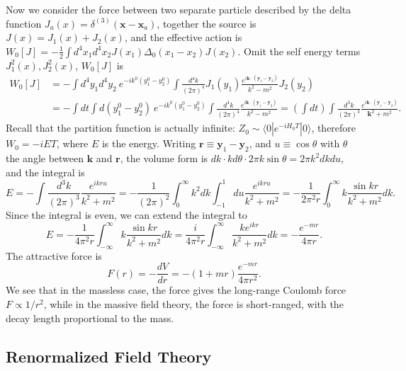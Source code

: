 \documentclass[aps,prb,superscriptaddress,nofootinbib]{revtex4}
\begin{document}
Now we consider the force between two separate particle described by the delta function $J_a(x) = \delta^{(3)}(\bm x - \bm x_a)$, together the source is $J(x) = J_1(x) + J_2(x)$, and the effective action is $W_0[J] = -\frac{1}{2}\int d^4x_1 d^4 x_2 J(x_1) \Delta_0(x_1-x_2) J(x_2)$.
Omit the self energy terms $J_1^2(x), J_2^2(x)$, $W_0[J]$ is
\begin{equation*}
\begin{aligned}
	W_0[J] &= -\int d^4 y_1 d^4 y_2\ e^{-ik^0(y_1^0-y_2^0)}\int \frac{d^4 k}{(2\pi)^4} J_1(y_1)\frac{e^{i\bm k\cdot (\bm y_1-\bm y_2)}}{k^2-m^2} J_2(y_2) \\
	&= -\int  dt \int d (y_1^0 - y_2^0) \ e^{-ik^0(y_1^0-y_2^0)}\int \frac{d^4 k}{(2\pi)^4} \frac{e^{i\bm k\cdot (\bm y_1-\bm y_2)}}{k^2-m^2} 
	= \left(\int dt \right)\int \frac{d^3 k}{(2\pi)^3} \frac{e^{i\bm k\cdot (\bm y_1-\bm y_2)}}{\bm k^2 + m^2}.
\end{aligned}
\end{equation*}
Recall that the partition function is actually infinite: $Z_0 \sim \langle 0| e^{-i H_0 T} |0\rangle$, therefore $W_0 = -i E T$, where $E$ is the energy.
Writing $\bm r \equiv \bm y_1 - \bm y_2$, and $u \equiv \cos\theta$ with $\theta$ the angle between $\bm k$ and $\bm r$, the volume form is $dk \cdot kd\theta \cdot  2\pi k \sin \theta = 2\pi k^2 dk du$, and the integral is
\begin{equation}
	E = -\int \frac{d^3 k}{(2\pi)^3} \frac{e^{i k r u}}{k^2 + m^2} 
	= - \frac{1}{(2\pi)^2} \int_0^\infty k^2 dk \int_{-1}^1 du \frac{e^{ikru}}{k^2 +m^2} 
	= -\frac{1}{2\pi^2 r} \int_0^\infty k  \frac{\sin kr}{k^2 +m^2} dk.
\end{equation}
Since the integral is even, we can extend the integral to
\begin{equation}
	E = -\frac{1}{4\pi^2 r} \int_{-\infty}^\infty k  \frac{\sin kr}{k^2 +m^2} dk 
	= \frac{i}{4\pi^2 r} \int_{-\infty}^\infty \frac{k e^{ikr}}{k^2 +m^2} dk
	= -\frac{e^{-mr}}{4\pi r}.
\end{equation}
The attractive force is
\begin{equation}
	F(r) = -\frac{dV}{dr} = -(1+mr)\frac{e^{-mr}}{4\pi r^2}.
\end{equation}
We see that in the massless case, the force gives the long-range Coulomb force $F \propto 1/r^2$, while in the massive field theory, the force is short-ranged, with the decay length proportional to the mass.



\subsection{Renormalized Field Theory}
\end{document}
